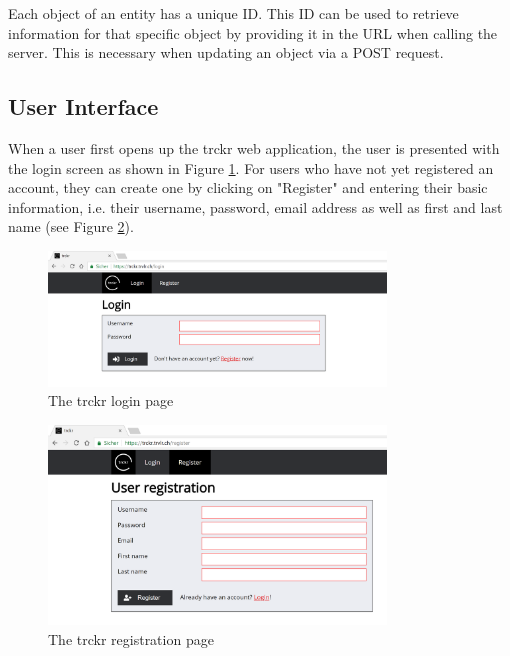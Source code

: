 \documentclass[bibliography=totoc, listof=totocnumbered]{scrartcl}
\begin{document}
Each object of an entity has a unique ID. This ID can be used to retrieve
information for that specific object by providing it in the URL when calling the
server. This is necessary when updating an object via a POST request.

\subsection{User Interface}

When a user first opens up the trckr web application, the user is presented with
the login screen as shown in Figure \ref{fig:trckr-login}. For users who have
not yet registered an account, they can create one by clicking on "Register" and
entering their basic information, i.e. their username, password, email address
as well as first and last name (see Figure \ref{fig:trckr-register}).

\begin{figure}[h]
    \includegraphics[width=0.8\textwidth]{trckr-login}
    \caption{The trckr login page}
    \label{fig:trckr-login}
\end{figure}

\begin{figure}[h]
    \includegraphics[width=0.8\textwidth]{trckr-register}
    \caption{The trckr registration page}
    \label{fig:trckr-register}
\end{figure}
\end{document}
